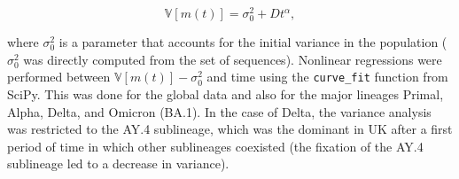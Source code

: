 \begin{equation}
    \mathbb{V}\left[m(t)\right] = \sigma_0^2 + Dt^\alpha,
\end{equation}

\noindent where $\sigma_0^2$ is a parameter that accounts for the initial variance in the population ($\sigma_0^2$ was directly computed from the set of sequences). Nonlinear regressions were performed between $\mathbb{V}\left[m(t)\right] - \sigma_0^2$ and time using the \texttt{curve\_fit} function from SciPy. This was done for the global data and also for the major lineages Primal, Alpha, Delta, and Omicron (BA.1). In the case of Delta, the variance analysis was restricted to the AY.4 sublineage, which was the dominant in UK after a first period of time in which other sublineages coexisted (the fixation of the AY.4 sublineage led to a decrease in variance).






